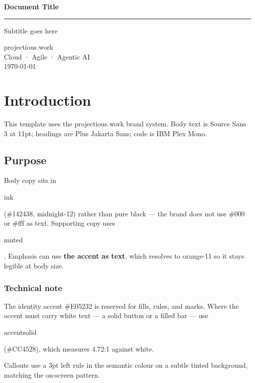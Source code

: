 \documentclass[a4paper,11pt]{article}
\newcommand{\code}[1]{{\ttfamily\colorbox{slate2}{\strut #1}}}
\newcommand{\accentemph}[1]{\textcolor{accenttext}{\textbf{#1}}}
\begin{document}
\begin{titlepage}
\vspace*{4cm}
{\sffamily\Huge\bfseries\color{midnight} Document Title\par}
\vspace{0.4cm}
{\color{accent}\rule{48pt}{3pt}\par}
\vspace{0.6cm}
{\sffamily\large\color{secondary} Subtitle goes here\par}
\vspace{2cm}
{\normalsize\color{muted}
projectious.work\\
Cloud · Agile · Agentic AI\\
\today
}
\end{titlepage}

\section{Introduction}

This template uses the projectious.work brand system. Body text is Source Sans 3
at 11pt; headings are Plus Jakarta Sans; code is IBM Plex Mono.

\subsection{Purpose}

Body copy sits in \code{ink} (\#142438, midnight-12) rather than pure black —
the brand does not use \#000 or \#fff as text. Supporting copy uses
\code{muted}. Emphasis can use \accentemph{the accent as text}, which resolves
to orange-11 so it stays legible at body size.

\subsubsection{Technical note}

The identity accent \#E05232 is reserved for fills, rules, and marks. Where the
accent must carry white text — a solid button or a filled bar — use
\code{accentsolid} (\#CC4528), which measures 4.72:1 against white.

\begin{brandnote}[Info]
Callouts use a 3pt left rule in the semantic colour on a subtle tinted
background, matching the on-screen pattern.
\end{brandnote}
\end{document}
